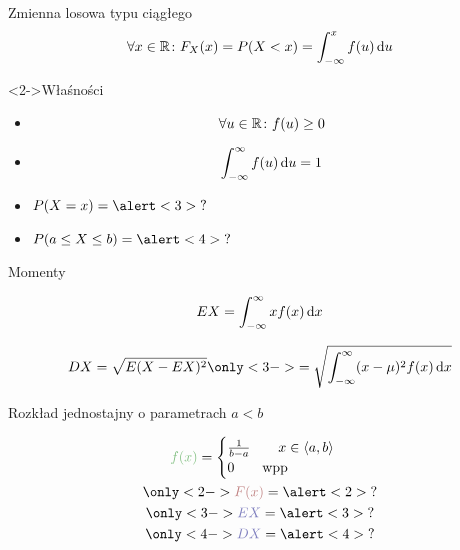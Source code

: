\documentclass{mp}
\subtitle{Zmienne losowe typu ciągłego}
\renewcommand{\d}[1]{\ensuremath\,\text{d}#1}
\begin{document}
\frame{\titlepage}
\begin{frame}{Zmienna losowa typu ciągłego}
\[ \forall x\in\R\colon F_X(x)=P(X<x)=\int_{-\infty}^x f(u)\d{u} \]
\begin{block}<2->{Właśności}
\begin{itemize}
\item \[\forall u\in\mathbb{R}\colon f(u)\geq 0\]
\item \[\int_{-\infty}^\infty f(u)\d{u}=1\]
\end{itemize}
\end{block}
{
	\begin{itemize}
	\item<3-> $P(X=x)=\alert<3>{?}$
	\item<4-> $P(a\leq X\leq b)=\alert<4>{?}$
	\end{itemize}
}
\end{frame}
\begin{frame}{Momenty}
\begin{description}
\item[wartość średnia] \[ EX=\int_{-\infty}^\infty xf(x)\d{x} \]
\item<2->[odchylenie standardowe] \[ DX=\sqrt{E(X-EX)^2}\only<3->{=\sqrt{\int_{-\infty}^\infty (x-\mu)^2f(x)\d{x}}} \]
\end{description}
\end{frame}
\begin{frame}{Rozkład jednostajny o parametrach $a<b$}
\begin{minipage}{.6\textwidth}
\end{minipage}
\begin{minipage}{.39\textwidth}
\begin{gather*}
\textcolor{color2}{f(x)}=\begin{cases} \frac{1}{b-a} \qquad x\in\left<a,b\right> \\ 0 \qquad \text{wpp}\end{cases} \\
\only<2->{\textcolor{color4}{F(x)}=\alert<2>{?}} \\
\only<3->{\textcolor{color3}{EX}=\alert<3>{?}}\\
\only<4->{\textcolor{color3}{DX}=\alert<4>{?}}
\end{gather*}
\end{minipage}
\end{frame}
\end{document}
